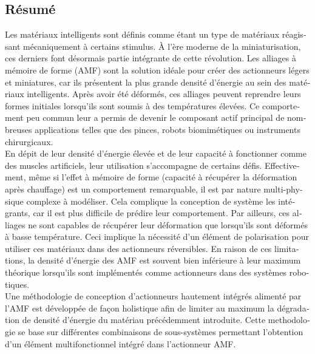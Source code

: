 \begin{otherlanguage}{french}
\cleardoublepage
\chapter*{Résumé}

Les matériaux intelligents sont définis comme étant un type de matériaux réagissant mécaniquement à certains stimulus. À l’ère moderne de la miniaturisation, ces derniers font désormais partie intégrante de cette révolution. Les alliages à mémoire de forme (AMF) sont la solution idéale pour créer des actionneurs légers et miniatures, car ils présentent la plus grande densité d’énergie au sein des matériaux intelligents. Après avoir été déformés, ces alliages peuvent reprendre leurs formes initiales lorsqu’ils sont soumis à des températures élevées. Ce comportement peu commun leur a permis de devenir le composant actif principal de nombreuses applications telles que des pinces, robots biomimétiques ou instruments chirurgicaux.\\

En dépit de leur densité d’énergie élevée et de leur capacité à fonctionner comme des muscles artificiels, leur utilisation s’accompagne de certains défis. Effectivement, même si l’effet à mémoire de forme (capacité à récupérer la déformation après chauffage) est un comportement remarquable, il est par nature multi-physique complexe à modéliser. Cela complique la conception de système les intégrants, car il est plus difficile de prédire leur comportement. Par ailleurs, ces alliages ne sont capables de récupérer leur déformation que lorsqu’ils sont déformés à basse température. Ceci implique la nécessité d’un élément de polarisation pour utiliser ces matériaux dans des actionneurs réversibles. En raison de ces limitations, la densité d’énergie des AMF est souvent bien inférieure à leur maximum théorique lorsqu’ils sont implémentés comme actionneurs dans des systèmes robotiques.\\

Une méthodologie de conception d’actionneurs hautement intégrés alimenté par l’AMF est développée de façon holistique afin de limiter au maximum la dégradation de densité d’énergie du matériau précédemment introduite. Cette methodologie se base sur différentes combinaisons de sous-systèmes permettant l’obtention d’un élément multifonctionnel intégré dans l’actionneur AMF.\\


\end{otherlanguage}

